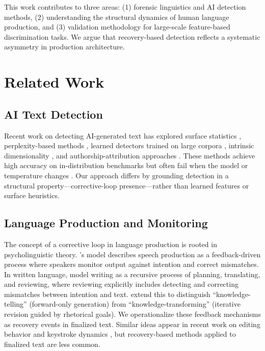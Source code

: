 \documentclass[final]{clv2025}
\begin{document}
This work contributes to three areas: (1) forensic linguistics and AI detection methods, (2) understanding the structural dynamics of human language production, and (3) validation methodology for large-scale feature-based discrimination tasks. We argue that recovery-based detection reflects a systematic asymmetry in production architecture.


\section{Related Work}

\subsection{AI Text Detection}

Recent work on detecting AI-generated text has explored surface statistics \citep{solaiman2019release,gehrmann2019gltr,mitchell2023detectgpt}, perplexity-based methods \citep{jauhiainen2023comparing}, learned detectors trained on large corpora \citep{wang2023mfd,sadasivan2024aigenerated,zellers2019defending,bakhtin2019real}, intrinsic dimensionality \citep{tulchinskii2024intrinsic}, and authorship-attribution approaches \citep{uchendu2020authorship}. These methods achieve high accuracy on in-distribution benchmarks but often fail when the model or temperature changes \citep{jiang2024detecting,tan2024llm}. Our approach differs by grounding detection in a structural property---corrective-loop presence---rather than learned features or surface heuristics.

\subsection{Language Production and Monitoring}

The concept of a corrective loop in language production is rooted in psycholinguistic theory. \citeauthor{levelt1989speaking}'s model \citeyearpar{levelt1989speaking} describes speech production as a feedback-driven process where speakers monitor output against intention and correct mismatches. In written language, \citet{flower1981cognitive} model writing as a recursive process of planning, translating, and reviewing, where reviewing explicitly includes detecting and correcting mismatches between intention and text. \citet{bereiter1987psychology} extend this to distinguish ``knowledge-telling'' (forward-only generation) from ``knowledge-transforming'' (iterative revision guided by rhetorical goals). We operationalize these feedback mechanisms as recovery events in finalized text. Similar ideas appear in recent work on editing behavior \citep{schrijvers2016signature} and keystroke dynamics \citep{sap2020recollection}, but recovery-based methods applied to finalized text are less common.
\end{document}
